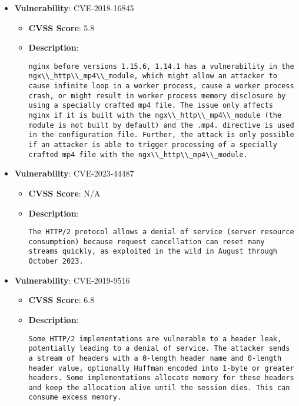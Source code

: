 \documentclass{article}
\begin{document}
\begin{itemize}
        \item \textbf{Vulnerability}: CVE-2018-16845
        \begin{itemize}
            \item \textbf{CVSS Score}:  5.8 
            \item \textbf{Description}:
            \parbox[t]{0.9\linewidth}{
                \verb|nginx before versions 1.15.6, 1.14.1 has a vulnerability in the ngx\\_http\\_mp4\\_module, which might allow an attacker to cause infinite loop in a worker process, cause a worker process crash, or might result in worker process memory disclosure by using a specially crafted mp4 file. The issue only affects nginx if it is built with the ngx\\_http\\_mp4\\_module (the module is not built by default) and the .mp4. directive is used in the configuration file. Further, the attack is only possible if an attacker is able to trigger processing of a specially crafted mp4 file with the ngx\\_http\\_mp4\\_module.|
            }
        \end{itemize}
    
        \item \textbf{Vulnerability}: CVE-2023-44487
        \begin{itemize}
            \item \textbf{CVSS Score}:  N/A 
            \item \textbf{Description}:
            \parbox[t]{0.9\linewidth}{
                \verb|The HTTP/2 protocol allows a denial of service (server resource consumption) because request cancellation can reset many streams quickly, as exploited in the wild in August through October 2023.|
            }
        \end{itemize}
    
        \item \textbf{Vulnerability}: CVE-2019-9516
        \begin{itemize}
            \item \textbf{CVSS Score}:  6.8 
            \item \textbf{Description}:
            \parbox[t]{0.9\linewidth}{
                \verb|Some HTTP/2 implementations are vulnerable to a header leak, potentially leading to a denial of service. The attacker sends a stream of headers with a 0-length header name and 0-length header value, optionally Huffman encoded into 1-byte or greater headers. Some implementations allocate memory for these headers and keep the allocation alive until the session dies. This can consume excess memory.|
            }
        \end{itemize}
    

\end{itemize}
\end{document}
